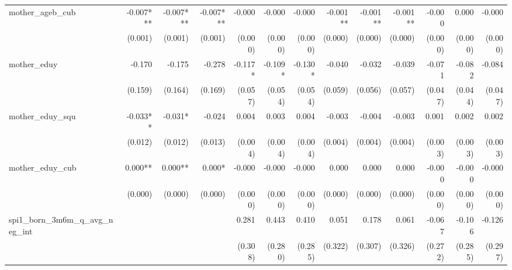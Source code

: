 \begin{tabular}{lrrrrrrrrrrrr}
mother\_ageb\_cub                           &    -0.007*** &    -0.007*** &    -0.007*** &       -0.000 &       -0.000 &       -0.000 &     -0.001** &     -0.001** &     -0.001** &       -0.000 &        0.000 &       -0.000 \\ 
                                            &      (0.001) &      (0.001) &      (0.001) &      (0.000) &      (0.000) &      (0.000) &      (0.000) &      (0.000) &      (0.000) &      (0.000) &      (0.000) &      (0.000) \\ 
mother\_eduy                                &       -0.170 &       -0.175 &       -0.278 &      -0.117* &      -0.109* &      -0.130* &       -0.040 &       -0.032 &       -0.039 &       -0.071 &       -0.082 &       -0.084 \\ 
                                            &      (0.159) &      (0.164) &      (0.169) &      (0.057) &      (0.054) &      (0.054) &      (0.059) &      (0.056) &      (0.057) &      (0.047) &      (0.044) &      (0.047) \\ 
mother\_eduy\_squ                           &     -0.033** &      -0.031* &       -0.024 &        0.004 &        0.003 &        0.004 &       -0.003 &       -0.004 &       -0.003 &        0.001 &        0.002 &        0.002 \\ 
                                            &      (0.012) &      (0.012) &      (0.013) &      (0.004) &      (0.004) &      (0.004) &      (0.004) &      (0.004) &      (0.004) &      (0.003) &      (0.003) &      (0.003) \\ 
mother\_eduy\_cub                           &      0.000** &      0.000** &       0.000* &       -0.000 &       -0.000 &       -0.000 &        0.000 &        0.000 &        0.000 &       -0.000 &       -0.000 &       -0.000 \\ 
                                            &      (0.000) &      (0.000) &      (0.000) &      (0.000) &      (0.000) &      (0.000) &      (0.000) &      (0.000) &      (0.000) &      (0.000) &      (0.000) &      (0.000) \\ 
spi1\_born\_3m6m\_q\_avg\_neg\_int          &              &              &              &        0.281 &        0.443 &        0.410 &        0.051 &        0.178 &        0.061 &       -0.067 &       -0.106 &       -0.126 \\ 
                                            &              &              &              &      (0.308) &      (0.280) &      (0.285) &      (0.322) &      (0.307) &      (0.326) &      (0.272) &      (0.285) &      (0.297) \\ 

\end{tabular}
